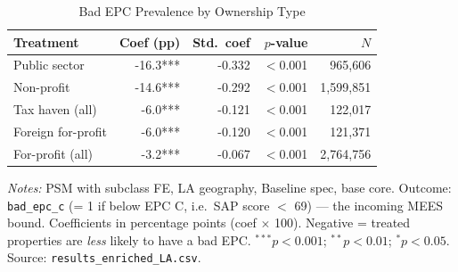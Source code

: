 \begin{table}[htbp]
\centering
\caption{Bad EPC Prevalence by Ownership Type}
\label{tab:h2_bad_epc}
\begin{tabular}{lrrrr}
\toprule
Treatment & Coef (pp) & Std.\ coef & $p$-value & $N$ \\
\midrule
Public sector & -16.3*** & -0.332 & $<$0.001 & 965,606 \\
Non-profit & -14.6*** & -0.292 & $<$0.001 & 1,599,851 \\
Tax haven (all) & -6.0*** & -0.121 & $<$0.001 & 122,017 \\
Foreign for-profit & -6.0*** & -0.120 & $<$0.001 & 121,371 \\
For-profit (all) & -3.2*** & -0.067 & $<$0.001 & 2,764,756 \\
\bottomrule
\end{tabular}
\begin{minipage}{0.9\textwidth}
\vspace{4pt}
\footnotesize
\textit{Notes:} PSM with subclass FE, LA geography, Baseline spec, base core.
Outcome: \texttt{bad\_epc\_c} (= 1 if below EPC C, i.e.\ SAP score $<$ 69) --- the incoming MEES bound.
Coefficients in percentage points (coef $\times$ 100).
Negative = treated properties are \textit{less} likely to have a bad EPC.
$^{***}p<0.001$; $^{**}p<0.01$; $^{*}p<0.05$.
Source: \texttt{results\_enriched\_LA.csv}.
\end{minipage}
\end{table}
